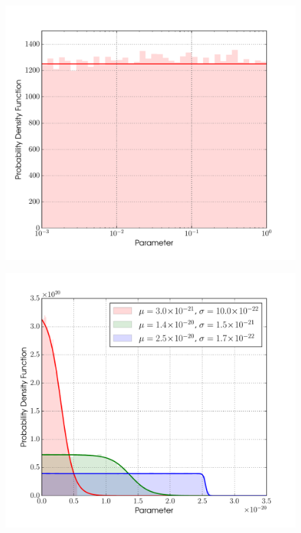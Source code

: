 \begin{figure}[!phtb]
\begin{center}
\includegraphics[width=1\columnwidth]{./figures/priors/loguniform/loguniform}
\caption{ \protect}
\end{center}
\end{figure}


\begin{figure}[!phtb]
\begin{center}
\includegraphics[width=1\columnwidth]{./figures/priors/fermidirac/fermidirac}
\caption{ \protect}
\end{center}
\end{figure}


